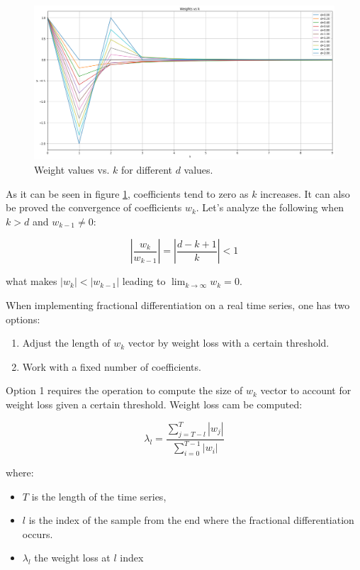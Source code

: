 \begin{figure}[!htb]
    \centering
    \includegraphics[width=\textwidth]{methods/images/weights_vs_k.png}
    \caption{Weight values vs. $k$ for different $d$ values.}
    \label{fig:w_k_vs_k}
\end{figure}

As it can be seen in figure \ref{fig:w_k_vs_k}, coefficients tend to zero as $k$
increases. It can also be proved the convergence of coefficients $w_k$. Let's
analyze the following when $k > d$ and $w_{k-1} \ne 0$:

\[|\frac{w_k}{w_{k-1}}| = |\frac{d-k+1}{k}| < 1 \]

what makes $|w_k| < |w_{k-1}|$ leading to $\lim_{k \to \infty} w_k = 0$.

When implementing fractional differentiation on a real time series, one has two
options:

\begin{enumerate}
  \item Adjust the length of $w_k$ vector by weight loss with a certain
        threshold.
  \item Work with a fixed number of coefficients.
\end{enumerate}

Option 1 requires the operation to compute the size of $w_k$ vector to account
for weight loss given a certain threshold. Weight loss cam be computed:

\begin{equation}
  \lambda_l = \frac{\sum_{j=T-l}^{T}|w_j|}{\sum_{i=0}^{T-1}|w_i|}
\end{equation}

where:

\begin{itemize}
  \item $T$ is the length of the time series,
  \item $l$ is the index of the sample from the end where the fractional
        differentiation occurs.
  \item $\lambda_l$ the weight loss at $l$ index
\end{itemize}

